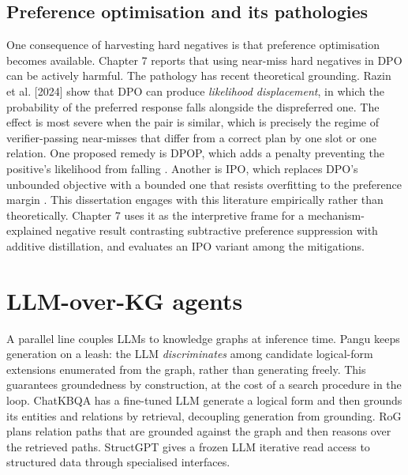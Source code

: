 \subsection{Preference optimisation and its pathologies}\label{sec:preference-optimisation-and-its-patholog}

One consequence of harvesting hard negatives is that preference optimisation becomes available. Chapter 7 reports that using near-miss hard negatives in DPO \citep{rafailov2023dpo} can be actively harmful. The pathology has recent theoretical grounding. Razin et al. [2024] show that DPO can produce \emph{likelihood displacement}, in which the probability of the preferred response falls alongside the dispreferred one. The effect is most severe when the pair is similar, which is precisely the regime of verifier-passing near-misses that differ from a correct plan by one slot or one relation. One proposed remedy is DPOP, which adds a penalty preventing the positive's likelihood from falling \citep{pal2024smaug}. Another is IPO, which replaces DPO's unbounded objective with a bounded one that resists overfitting to the preference margin \citep{azar2024ipo}. This dissertation engages with this literature empirically rather than theoretically. Chapter 7 uses it as the interpretive frame for a mechanism-explained negative result contrasting subtractive preference suppression with additive distillation, and evaluates an IPO variant among the mitigations.

\section{LLM-over-KG agents}\label{sec:llm-over-kg-agents}

A parallel line couples LLMs to knowledge graphs at inference time. Pangu \citep{gu2023pangu} keeps generation on a leash: the LLM \emph{discriminates} among candidate logical-form extensions enumerated from the graph, rather than generating freely. This guarantees groundedness by construction, at the cost of a search procedure in the loop. ChatKBQA \citep{luo2024chatkbqa} has a fine-tuned LLM generate a logical form and then grounds its entities and relations by retrieval, decoupling generation from grounding. RoG \citep{luo2024rog} plans relation paths that are grounded against the graph and then reasons over the retrieved paths. StructGPT \citep{jiang2023structgpt} gives a frozen LLM iterative read access to structured data through specialised interfaces.

